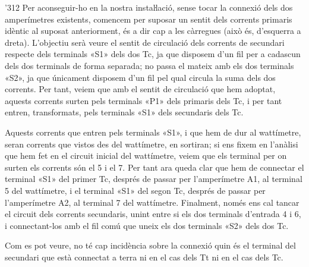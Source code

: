 \begin{exemple}
\begin{dingautolist}{'312}
    Per aconseguir-ho en la nostra instaŀlació, sense tocar la
    connexió dels dos amperímetres existents, comencem per suposar un
    sentit dels corrents primaris idèntic al suposat anteriorment, és a
    dir cap a les càrregues (això és, d'esquerra a dreta). L'objectiu
    serà veure el sentit de circulació dels corrents de secundari
    respecte dels terminals «\textsf{S1}» dels dos Tc, ja que disposem d'un fil per
    a cadascun dels dos terminals de forma separada; no passa el mateix
    amb els dos terminals «\textsf{S2}», ja que únicament disposem d'un fil pel
    qual circula la suma dels dos corrents. Per tant, veiem que amb el
    sentit de circulació que hem adoptat, aquests corrents surten pels
    terminals «\textsf{P1}» dels primaris dels Tc, i per tant entren, transformats,
    pels terminals «\textsf{S1}» dels secundaris dels Tc.

    Aquests corrents que entren pels terminals «\textsf{S1}», i que hem de dur al
    wattímetre, seran corrents que vistos des del wattímetre, en
    sortiran; si ens fixem en l'anàlisi que hem fet en el
    circuit inicial del wattímetre, veiem que els terminal per on surten
    els corrents són el 5 i el 7. Per tant ara queda clar que hem de
    connectar el terminal «\textsf{S1}» del primer Tc, després de passar per
    l'amperímetre \textsf{A1}, al terminal 5 del wattímetre, i el
    terminal «\textsf{S1}» del segon Tc, després de passar per l'amperímetre
    \textsf{A2}, al terminal 7 del wattímetre. Finalment, només ens cal
    tancar el circuit dels corrents secundaris, unint entre si els dos
    terminals d'entrada 4  i 6, i connectant-los amb el fil comú que
    uneix els dos terminals «\textsf{S2}» dels dos Tc.

    Com es pot veure, no té cap incidència sobre la connexió quin és
    el terminal del secundari que està connectat a terra ni en el cas
    dels Tt ni en el cas dels Tc.
    \end{dingautolist}

     \begin{center}
        
    \end{center}

\end{exemple}
